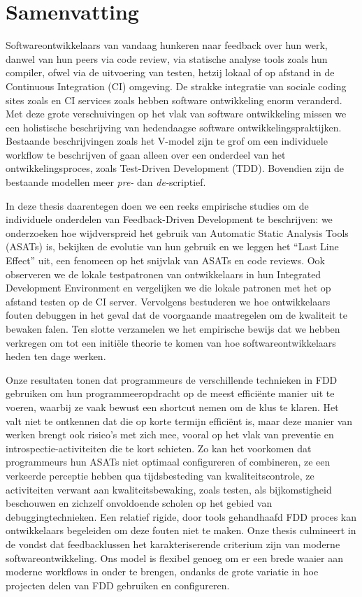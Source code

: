 \chapter*{Samenvatting}

{

Softwareontwikkelaars van vandaag hunkeren naar feedback over hun werk, danwel van hun peers via
code review, via statische analyse tools zoals hun compiler, ofwel via de uitvoering van testen, hetzij
lokaal of op afstand in de Continuous Integration (CI) omgeving. De strakke integratie van sociale
coding sites zoals \github en CI services zoals \travis hebben software ontwikkeling enorm
veranderd. Met deze grote verschuivingen op het vlak van software ontwikkeling missen we een
holistische beschrijving van hedendaagse software ontwikkelingspraktijken. Bestaande beschrijvingen
zoals het V-model zijn te grof om een individuele workflow te beschrijven of gaan alleen over een
onderdeel van het ontwikkelingsproces, zoals Test-Driven Development (TDD). Bovendien zijn de
bestaande modellen meer \emph{pre-} dan \emph{de-}scriptief.

In deze thesis daarentegen doen we een reeks empirische studies om de individuele onderdelen van
Feedback-Driven Development te beschrijven: we onderzoeken hoe wijdverspreid het gebruik van
Automatic Static Analysis Tools (ASATs) is, bekijken de evolutie van hun
gebruik en we leggen
het ``Last Line Effect'' uit, een fenomeen op het snijvlak van ASATs en code
reviews. Ook observeren we
de lokale testpatronen van ontwikkelaars in hun Integrated Development
Environment en vergelijken we
die lokale patronen met het op afstand testen op de CI server. Vervolgens bestuderen we hoe
ontwikkelaars fouten debuggen in het geval dat de voorgaande maatregelen om de kwaliteit te bewaken
falen. Ten slotte verzamelen we het empirische bewijs dat we hebben verkregen om tot een initi{\"e}le
theorie te komen van hoe softwareontwikkelaars heden ten dage werken.


Onze resultaten tonen dat programmeurs de verschillende technieken in FDD gebruiken om hun
programmeeropdracht op de meest effici{\"e}nte manier uit te voeren, waarbij ze vaak bewust een
shortcut nemen om de klus te klaren. Het valt niet te ontkennen dat die op korte termijn effici{\"e}nt
is, maar deze manier van werken brengt ook risico’s met zich mee, vooral op het vlak van preventie
en introspectie-activiteiten die te kort schieten. Zo kan het voorkomen dat programmeurs hun ASATs
niet optimaal configureren of combineren, ze een verkeerde perceptie hebben qua tijdsbesteding van
kwaliteitscontrole, ze activiteiten verwant aan kwaliteitsbewaking, zoals testen, als
bijkomstigheid beschouwen en zichzelf onvoldoende scholen op het gebied van debuggingtechnieken. Een relatief rigide, door tools gehandhaafd FDD proces kan ontwikkelaars begeleiden om
deze fouten niet te maken. Onze thesis culmineert in de vondst dat feedbacklussen het
karakteriserende criterium zijn van moderne softwareontwikkeling. Ons model is flexibel genoeg om
er een brede waaier aan moderne workflows in onder te brengen, ondanks de grote variatie in hoe
projecten delen van FDD gebruiken en configureren.}



